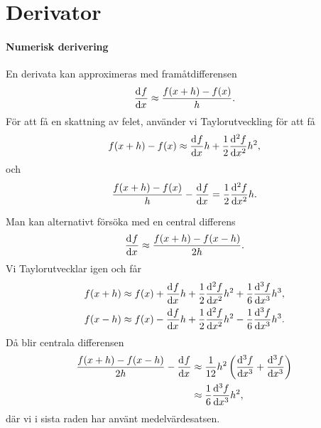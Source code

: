 \section{Derivator}

\paragraph{Numerisk derivering}
En derivata kan approximeras med framåtdifferensen
\begin{align*}
	\dv[]{f}{x} (x) \approx \frac{f(x + h) - f(x)}{h}.
\end{align*}
För att få en skattning av felet, använder vi Taylorutveckling för att få
\begin{align*}
	f(x + h) - f(x) \approx \dv[]{f}{x} (x)h + \frac{1}{2}\dv[2]{f}{x} (c)h^{2},
\end{align*}
och
\begin{align*}
	\frac{f(x + h) - f(x)}{h} - \dv[]{f}{x} (x) = \frac{1}{2}\dv[2]{f}{x} (c)h.
\end{align*}

Man kan alternativt försöka med en central differens
\begin{align*}
	\dv[]{f}{x} (x) \approx \frac{f(x + h) - f(x - h)}{2h}.
\end{align*}
Vi Taylorutvecklar igen och får
\begin{align*}
	f(x + h) &\approx f(x) + \dv[]{f}{x} (x)h + \frac{1}{2}\dv[2]{f}{x} (x)h^{2} + \frac{1}{6}\dv[3]{f}{x} (c_{1})h^{3}, \\
	f(x - h) &\approx f(x) - \dv[]{f}{x} (x)h + \frac{1}{2}\dv[2]{f}{x} (x)h^{2} - \frac{1}{6}\dv[3]{f}{x} (c_{2})h^{3}.
\end{align*}
Då blir centrala differensen
\begin{align*}
	\frac{f(x + h) - f(x - h)}{2h} - \dv[]{f}{x} (x) &\approx \frac{1}{12}h^{2}\left(\dv[3]{f}{x} (c_{1}) + \dv[3]{f}{x} (c_{2})\right) \\
	                                                 &\approx \frac{1}{6}\dv[3]{f}{x} (c)h^{2},
\end{align*}
där vi i sista raden har använt medelvärdesatsen.